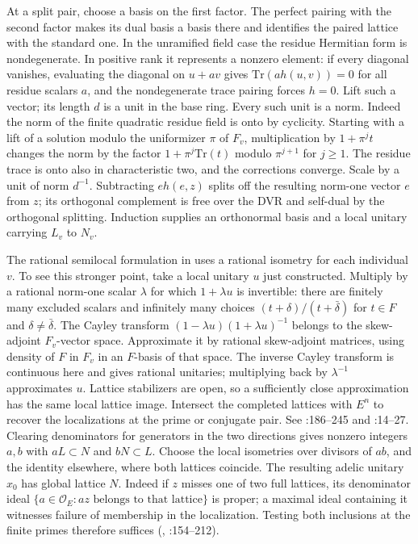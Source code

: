 At a split pair, choose a basis on the first factor. The perfect pairing
with the second factor makes its dual basis a basis there and
identifies the paired lattice with the standard one. In the unramified
field case the residue Hermitian form is nondegenerate. In positive
rank it represents a nonzero element: if every diagonal vanishes,
evaluating the diagonal on $u+a v$ gives
$\mathrm{Tr}(a h(u,v))=0$ for all residue scalars $a$, and the
nondegenerate trace pairing forces $h=0$. Lift such a vector; its
length $d$ is a unit in the base ring. Every such unit is a norm.
Indeed the norm of the finite quadratic residue field is onto by
cyclicity. Starting with a lift of a solution modulo the uniformizer
$\pi$ of $F_v$, multiplication by $1+\pi^j t$ changes the norm by
the factor $1+\pi^j\mathrm{Tr}(t)$ modulo $\pi^{j+1}$ for $j\ge1$.
The residue trace is onto also in characteristic two, and the corrections
converge. Scale by a unit of norm $d^{-1}$. Subtracting
$e h(e,z)$ splits off the resulting norm-one vector $e$ from $z$;
its orthogonal complement is free over the DVR and self-dual by the
orthogonal splitting. Induction supplies an orthonormal basis and a
local unitary carrying $L_v$ to $N_v$.

The rational semilocal formulation in 
uses a rational isometry for each individual $v$. To see this stronger
point, take a local unitary $u$ just constructed. Multiply by a rational
norm-one scalar $\lambda$ for which $1+\lambda u$ is invertible:
there are finitely many excluded scalars and infinitely many choices
$(t+\delta)/(t+\bar\delta)$ for $t\in F$ and
$\delta\ne\bar\delta$. The Cayley transform
$(1-\lambda u)(1+\lambda u)^{-1}$ belongs to the skew-adjoint
$F_v$-vector space. Approximate it by rational skew-adjoint matrices,
using density of $F$ in $F_v$ in an $F$-basis of that space. The inverse
Cayley transform is continuous here and gives rational unitaries;
multiplying back by $\lambda^{-1}$ approximates $u$. Lattice stabilizers
are open, so a sufficiently close approximation has the same local
lattice image. Intersect the completed lattices with $E^n$ to recover
the localizations at the prime or conjugate pair.
See :186--245 and
:14--27.
Clearing denominators for generators in the two directions gives
nonzero integers $a,b$ with $aL\subset N$ and $bN\subset L$. Choose
the local isometries over divisors of $ab$, and the identity elsewhere,
where both lattices coincide. The resulting adelic unitary $x_0$
has global lattice $N$. Indeed if $z$ misses one of two full lattices,
its denominator ideal $\{a\in\mathcal O_E:az\text{ belongs to that lattice}\}$
is proper; a maximal ideal containing it witnesses failure of membership
in the localization. Testing both inclusions at the finite primes
therefore suffices (,
:154--212).

